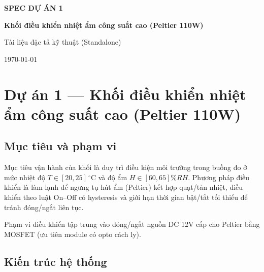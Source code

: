 \documentclass[12pt,a4paper]{report}
\begin{document}
\begin{titlepage}
\centering
\vspace*{2cm}

{\Large \textbf{SPEC DỰ ÁN 1}\par}
\vspace{0.5cm}
{\LARGE \textbf{Khối điều khiển nhiệt ẩm công suất cao (Peltier 110W)}\par}

\vspace{1.5cm}
{\large Tài liệu đặc tả kỹ thuật (Standalone)\par}

\vfill
{\large \today\par}
\end{titlepage}

\tableofcontents
\clearpage

\chapter{Dự án 1 --- Khối điều khiển nhiệt ẩm công suất cao (Peltier 110W)}

\section{Mục tiêu và phạm vi}
Mục tiêu vận hành của khối là duy trì điều kiện môi trường trong buồng đo ở mức nhiệt độ $T \in [20, 25]\,^\circ$C và độ ẩm $H \in [60, 65]\%RH$. Phương pháp điều khiển là làm lạnh để ngưng tụ hút ẩm (Peltier) kết hợp quạt/tản nhiệt, điều khiển theo luật On--Off có hysteresis và giới hạn thời gian bật/tắt tối thiểu để tránh đóng/ngắt liên tục.

Phạm vi điều khiển tập trung vào đóng/ngắt nguồn DC 12V cấp cho Peltier bằng MOSFET (ưu tiên module có opto cách ly).

\section{Kiến trúc hệ thống}
\end{document}
